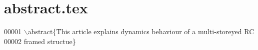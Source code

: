 \hypertarget{abstract_8tex_source}{}\section{abstract.\+tex}
\label{abstract_8tex_source}

\begin{DoxyCode}
00001 \(\backslash\)abstract\{This article explains dynamics behaviour of a multi-storeyed RC
00002 framed structue\}
\end{DoxyCode}
